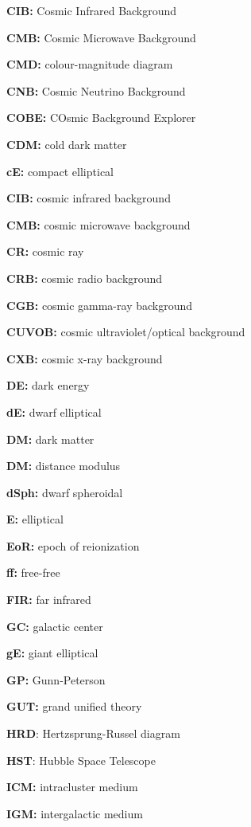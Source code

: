 \documentclass[a4paper,11pt]{article}
\begin{document}
{\noindent}\textbf{CIB:} Cosmic Infrared Background

{\noindent}\textbf{CMB:} Cosmic Microwave Background

{\noindent}\textbf{CMD:} colour-magnitude diagram

{\noindent}\textbf{CNB:} Cosmic Neutrino Background

{\noindent}\textbf{COBE:} COsmic Background Explorer

{\noindent}\textbf{CDM:} cold dark matter

{\noindent}\textbf{cE:} compact elliptical

{\noindent}\textbf{CIB:} cosmic infrared background

{\noindent}\textbf{CMB:} cosmic microwave background

{\noindent}\textbf{CR:} cosmic ray

{\noindent}\textbf{CRB:} cosmic radio background

{\noindent}\textbf{CGB:} cosmic gamma-ray background

{\noindent}\textbf{CUVOB:} cosmic ultraviolet/optical background

{\noindent}\textbf{CXB:} cosmic x-ray background

{\noindent}\textbf{DE:} dark energy

{\noindent}\textbf{dE:} dwarf elliptical

{\noindent}\textbf{DM:} dark matter

{\noindent}\textbf{DM:} distance modulus

{\noindent}\textbf{dSph:} dwarf spheroidal

{\noindent}\textbf{E:} elliptical

{\noindent}\textbf{EoR:} epoch of reionization

{\noindent}\textbf{ff:} free-free

{\noindent}\textbf{FIR:} far infrared

{\noindent}\textbf{GC:} galactic center

{\noindent}\textbf{gE:} giant elliptical

{\noindent}\textbf{GP:} Gunn-Peterson

{\noindent}\textbf{GUT:} grand unified theory

{\noindent}\textbf{HRD}: Hertzsprung-Russel diagram

{\noindent}\textbf{HST}: Hubble Space Telescope

{\noindent}\textbf{ICM:} intracluster medium

{\noindent}\textbf{IGM:} intergalactic medium
\end{document}
